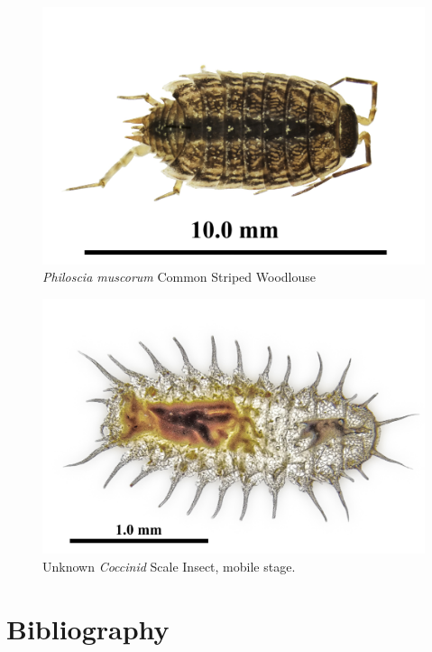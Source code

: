 \documentclass[
]{article}
\begin{document}
\begin{figure}

{\centering \includegraphics[width=0.8\linewidth]{images/PhilosciaMuscorum} 

}

\caption{\textit{Philoscia muscorum} Common Striped Woodlouse}\label{fig:PhilosciaMuscorum}
\end{figure}

\begin{figure}

{\centering \includegraphics[width=0.8\linewidth]{images/Coccinid} 

}

\caption{Unknown \textit{Coccinid} Scale Insect, mobile stage.}\label{fig:Coccinid}
\end{figure}

\newpage

\hypertarget{bibliography}{%
\section*{Bibliography}\label{bibliography}}
\end{document}
